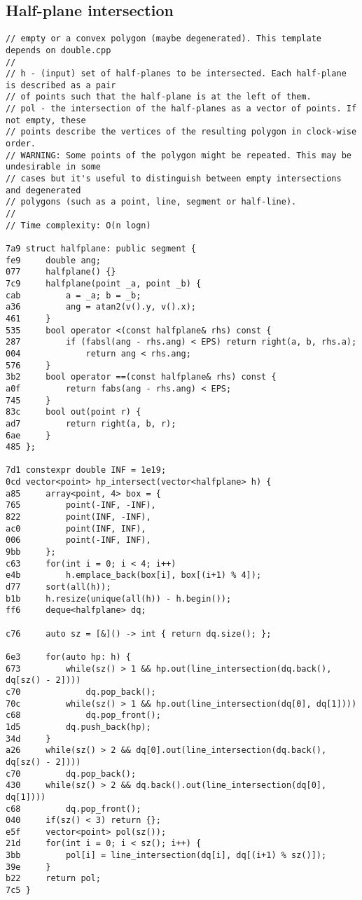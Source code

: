 \documentclass[11pt, a4paper, twoside]{article}
\begin{document}
\subsection{Half-plane intersection}
\begin{lstlisting}
// empty or a convex polygon (maybe degenerated). This template depends on double.cpp
//
// h - (input) set of half-planes to be intersected. Each half-plane is described as a pair
// of points such that the half-plane is at the left of them.
// pol - the intersection of the half-planes as a vector of points. If not empty, these
// points describe the vertices of the resulting polygon in clock-wise order.
// WARNING: Some points of the polygon might be repeated. This may be undesirable in some
// cases but it's useful to distinguish between empty intersections and degenerated
// polygons (such as a point, line, segment or half-line).
//
// Time complexity: O(n logn)

7a9 struct halfplane: public segment {
fe9 	double ang;
077 	halfplane() {}
7c9 	halfplane(point _a, point _b) {
cab 		a = _a; b = _b;
a36 		ang = atan2(v().y, v().x);
461 	}
535 	bool operator <(const halfplane& rhs) const {
287 		if (fabsl(ang - rhs.ang) < EPS) return right(a, b, rhs.a);
004 	        return ang < rhs.ang;
576 	}
3b2 	bool operator ==(const halfplane& rhs) const {
a0f 		return fabs(ang - rhs.ang) < EPS; 
745 	}
83c 	bool out(point r) {
ad7 		return right(a, b, r);
6ae 	}
485 };

7d1 constexpr double INF = 1e19;
0cd vector<point> hp_intersect(vector<halfplane> h) {
a85 	array<point, 4> box = {
765 		point(-INF, -INF),
822 		point(INF, -INF),
ac0 		point(INF, INF),
006 		point(-INF, INF),
9bb 	};
c63 	for(int i = 0; i < 4; i++)
e4b 		h.emplace_back(box[i], box[(i+1) % 4]);
d77 	sort(all(h));
b1b 	h.resize(unique(all(h)) - h.begin());
ff6 	deque<halfplane> dq;
    
c76 	auto sz = [&]() -> int { return dq.size(); };
    
6e3 	for(auto hp: h) {
673 		while(sz() > 1 && hp.out(line_intersection(dq.back(), dq[sz() - 2])))
c70 			dq.pop_back();
70c 		while(sz() > 1 && hp.out(line_intersection(dq[0], dq[1])))
c68 			dq.pop_front();
1d5 		dq.push_back(hp);
34d 	}
a26 	while(sz() > 2 && dq[0].out(line_intersection(dq.back(), dq[sz() - 2])))
c70 		dq.pop_back();
430 	while(sz() > 2 && dq.back().out(line_intersection(dq[0], dq[1])))
c68 		dq.pop_front();
040 	if(sz() < 3) return {};
e5f 	vector<point> pol(sz());
21d 	for(int i = 0; i < sz(); i++) {
3bb 		pol[i] = line_intersection(dq[i], dq[(i+1) % sz()]);
39e 	}
b22 	return pol;
7c5 }
\end{lstlisting}
\end{document}
